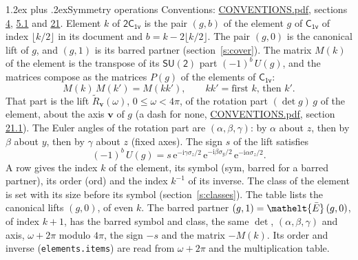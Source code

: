 \documentclass[10pt,a4paper]{article}
\makeatletter
\renewcommand\section{\@startsection{section}{1}{\z@}{-3ex plus -1ex minus -.2ex}%
  {1.2ex plus .2ex}{\normalfont\large\sffamily\bfseries\color{parttitle}}}
\numberwithin{equation}{section}
\newcommand{\eltfont}[1]{{\let\sigma\eltsigma\mathelt{#1}}}
\newcommand{\grp}[1]{\mathsf{#1}}
\newcommand{\elt}[1]{\eltfont{#1}}
\newcommand{\vv}{\mathbf{v}}
\newcommand{\iunit}{\mathrm{i}}
\newcommand{\expe}{\mathrm{e}}
\newcommand{\barred}[1]{\bar{#1}}
\newcommand{\lift}[1]{\tilde{#1}}
\newcommand{\pauli}[1]{\sigma_{#1}}
\makeatother
\begin{document}
\section{Symmetry operations}\label{s:elements}
Conventions: \href{../../CONVENTIONS.pdf}{CONVENTIONS.pdf}, sections \href{../../../rotation/CONVENTIONS.pdf\#conv.4}{4}, \href{../../../rotation/CONVENTIONS.pdf\#conv.5.1}{5.1} and \href{../../CONVENTIONS.pdf\#conv.21}{21}.
\leavevmode\label{n:index.element}\label{n:element.g}Element $k$ of $\grp{2C_{1v}}$ is the pair $(g, b)$ of the element $g$ of \href{../../../rotation/data/pdf/C1v.pdf}{$\grp{C_{1v}}$} of index $\lfloor k/2\rfloor$ in its document and $b = k - 2\lfloor k/2\rfloor$. The pair $(g, 0)$ is the canonical lift of $g$, and $(g, 1)$ is its barred partner (section~\ref{s:cover}). \label{n:matrix.element.pin}\label{n:matrix.element}The matrix $M(k)$ of the element is the transpose of its $\grp{SU(2)}$ part $(-1)^{b}\,U(g)$, and the matrices compose as the matrices $P(g)$ of the elements of $\grp{C_{1v}}$:
\begin{equation}\label{e:mprod}M(k)\,M(k') = M(kk'),\qquad kk' = \text{first } k\text{, then } k'.\end{equation}
\leavevmode\label{n:angle.omega}\label{n:vector.axis}\label{n:vector.pole}That part is the lift $\lift{R}_{\vv}(\omega)$, $0 \le \omega < 4\pi$, of the rotation part $(\det g)\,g$ of the element, about the axis $\vv$ of $g$ (a dash for none, \href{../../CONVENTIONS.pdf}{CONVENTIONS.pdf}, section \href{../../CONVENTIONS.pdf\#conv.21.1}{21.1}). \label{n:angle.euler.alpha}\label{n:angle.euler.beta}\label{n:angle.euler.gamma}\label{n:vector.coordinates}The Euler angles of the rotation part are $(\alpha,\beta,\gamma)$: by $\alpha$ about $z$, then by $\beta$ about $y$, then by $\gamma$ about $z$ (fixed axes). \label{n:local.euler.sign}The sign $s$ of the lift satisfies
\begin{equation}\label{e:euler}(-1)^{b}\,U(g) = s\,\expe^{-\iunit\gamma\pauli{z}/2}\,\expe^{-\iunit\beta\pauli{y}/2}\,\expe^{-\iunit\alpha\pauli{z}/2}.\end{equation}
\leavevmode\label{n:index.element.inverse}\label{n:head.sym}\label{n:head.ord}A row gives the index $k$ of the element, its symbol (sym, barred for a barred partner), its order (ord) and the index $k^{-1}$ of its inverse. \label{n:head.class}The class of the element is set with its size before its symbol (section~\ref{s:classes}).
The table lists the canonical lifts $(g, 0)$, of even $k$. The barred partner $(g, 1) = \elt{\barred{E}}\,(g, 0)$, of index $k + 1$, has the barred symbol and class, the same $\det$, $(\alpha,\beta,\gamma)$ and axis, $\omega + 2\pi$ modulo $4\pi$, the sign $-s$ and the matrix $-M(k)$. Its order and inverse (\texttt{elements.items}) are read from $\omega + 2\pi$ and the multiplication table.
\end{document}
